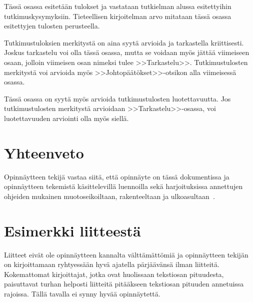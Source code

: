\documentclass[finnish, 12pt, a4paper, elec, utf8, a-1b, online]{aaltothesis}
\begin{document}
Tässä osassa esitetään tulokset ja vastataan tutkielman alussa
esitettyihin tutkimuskysymyksiin. Tieteellisen kirjoitelman
arvo mitataan tässä osassa esitettyjen tulosten perusteella.

Tutkimustuloksien merkitystä on aina syytä arvioida ja tarkastella
kriittisesti.  Joskus tarkastelu voi olla tässä osassa, mutta se
voidaan myös jättää viimeiseen osaan, jolloin viimeisen osan nimeksi
tulee >>Tarkastelu>>. Tutkimustulosten merkitystä voi arvioida myös
>>Johtopäätökset>>-otsikon alla viimeisessä osassa.

Tässä osassa on syytä myös arvioida tutkimustulosten luotettavuutta.
Jos tutkimustulosten merkitystä arvioidaan >>Tarkastelu>>-osassa,
voi luotettavuuden arviointi olla myös siellä.

\clearpage

\section{Yhteenveto}

Opinnäytteen tekijä vastaa siitä, että opinnäyte on tässä dokumentissa
ja opinnäytteen tekemistä käsittelevillä luennoilla sekä
harjoituksissa annettujen ohjeiden mukainen muotoseikoiltaan,
rakenteeltaan ja ulkoasultaan~\cite{laine2020_laas}.

\clearpage

\thesisbibliography{}
\printbibliography{}

\clearpage
\thesisappendix

\section{Esimerkki liitteestä\label{LiiteA}}

Liitteet eivät ole opinnäytteen kannalta välttämättömiä ja
opinnäytteen tekijän on
kirjoittamaan ryhtyessään hyvä ajatella pärjäävänsä ilman liitteitä.
Kokemattomat kirjoittajat, jotka ovat huolissaan
tekstiosan pituudesta, paisuttavat turhan
helposti liitteitä pitääkseen tekstiosan pituuden annetuissa rajoissa.
Tällä tavalla ei synny hyvää opinnäytettä.
\end{document}
